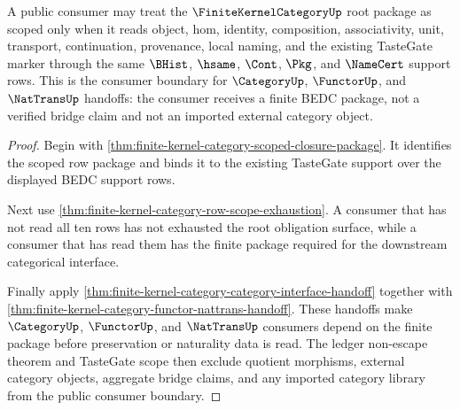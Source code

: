 \begin{theorem}
\label{thm:finite-kernel-category-public-consumer-boundary}
A public consumer may treat the $\FiniteKernelCategoryUp$ root package as scoped only when it reads object, hom, identity, composition, associativity, unit, transport, continuation, provenance, local naming, and the existing TasteGate marker through the same $\BHist$, $\hsame$, $\Cont$, $\Pkg$, and $\NameCert$ support rows. This is the consumer boundary for $\CategoryUp$, $\FunctorUp$, and $\NatTransUp$ handoffs: the consumer receives a finite BEDC package, not a verified bridge claim and not an imported external category object.
\end{theorem}
\begin{proof}
Begin with \autoref{thm:finite-kernel-category-scoped-closure-package}. It identifies the scoped row package and binds it to the existing TasteGate support over the displayed BEDC support rows.

Next use \autoref{thm:finite-kernel-category-row-scope-exhaustion}. A consumer that has not read all ten rows has not exhausted the root obligation surface, while a consumer that has read them has the finite package required for the downstream categorical interface.

Finally apply \autoref{thm:finite-kernel-category-category-interface-handoff} together with \autoref{thm:finite-kernel-category-functor-nattrans-handoff}. These handoffs make $\CategoryUp$, $\FunctorUp$, and $\NatTransUp$ consumers depend on the finite package before preservation or naturality data is read. The ledger non-escape theorem and TasteGate scope then exclude quotient morphisms, external category objects, aggregate bridge claims, and any imported category library from the public consumer boundary.
\end{proof}

